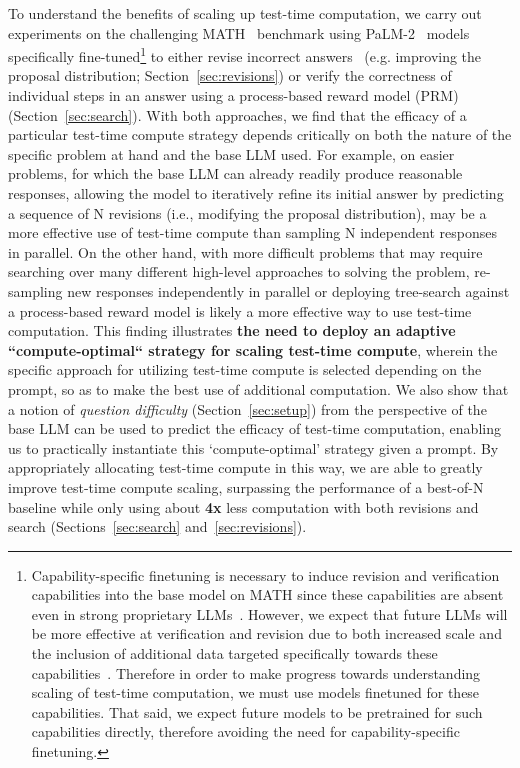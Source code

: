 \documentclass[11pt, letterpaper, logo]{googledeepmind}
\begin{document}
To understand the benefits of scaling up test-time computation, we carry out experiments on the challenging MATH~\citep{hendrycks2021measuring} benchmark using PaLM-2~\citep{anil2023palm} models specifically fine-tuned\footnote{Capability-specific finetuning is necessary to induce revision and verification capabilities into the base model on MATH since these capabilities are absent even in strong proprietary LLMs~\citep{huang2023large,sharma2024criticalevaluationaifeedback}. However, we expect that future LLMs will be more effective at verification and revision due to both increased scale and the inclusion of additional data targeted specifically towards these capabilities~\citep{predictemergence,blakeney2024doesdatasparkjoy,llmcriticscatchbugs}. Therefore in order to make progress towards understanding scaling of test-time computation, we must use models finetuned for these capabilities. That said, we expect future models to be pretrained for such capabilities directly, therefore avoiding the need for capability-specific finetuning.} to either revise incorrect answers~\citep{qu2024recursive} (e.g. improving the proposal distribution; Section~\ref{sec:revisions}) or verify the correctness of individual steps in an answer using a process-based reward model (PRM)~\citep{lightman2023lets,wang2023mathshepherd} (Section~\ref{sec:search}).
With both approaches, we find that the efficacy of a particular test-time compute strategy depends critically on both the nature of the specific problem at hand and the base LLM used. For example, on easier problems, for which the base LLM can already readily produce reasonable responses, allowing the model to iteratively refine its initial answer by predicting a sequence of N revisions (i.e., modifying the proposal distribution), may be a more effective use of test-time compute than sampling N independent responses in parallel. On the other hand, with more difficult problems that may require searching over many different high-level approaches to solving the problem, re-sampling new responses independently in parallel or deploying tree-search against a process-based reward model is likely a more effective way to use test-time computation.
This finding illustrates \textbf{the need to deploy an adaptive {``compute-optimal``} strategy for scaling test-time compute}, wherein the specific approach for utilizing test-time compute is selected depending on the prompt, so as to make the best use of additional computation.
We also show that a notion of \emph{question difficulty} (Section~\ref{sec:setup}) from the perspective of the base LLM can be used to predict the efficacy of test-time computation, enabling us to practically instantiate this `compute-optimal' strategy given a prompt. By appropriately allocating test-time compute in this way, we are able to greatly improve test-time compute scaling, surpassing the performance of a best-of-N baseline while only using about \textbf{4x} less computation with both revisions and search (Sections~\ref{sec:search} and~\ref{sec:revisions}).
\end{document}
